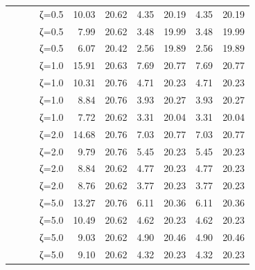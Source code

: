 \begin{table}[htbp]
\begin{tabular}{ll r l  rr  rr  rr}
  &  &  & ζ=0.5 & 10.03 & 20.62 & 4.35 & 20.19 & 4.35 & 20.19 \\
  &  &  & ζ=0.5 & 7.99 & 20.62 & 3.48 & 19.99 & 3.48 & 19.99 \\
  &  &  & ζ=0.5 & 6.07 & 20.42 & 2.56 & 19.89 & 2.56 & 19.89 \\
  &  &  & ζ=1.0 & 15.91 & 20.63 & 7.69 & 20.77 & 7.69 & 20.77 \\
  &  &  & ζ=1.0 & 10.31 & 20.76 & 4.71 & 20.23 & 4.71 & 20.23 \\
  &  &  & ζ=1.0 & 8.84 & 20.76 & 3.93 & 20.27 & 3.93 & 20.27 \\
  &  &  & ζ=1.0 & 7.72 & 20.62 & 3.31 & 20.04 & 3.31 & 20.04 \\
  &  &  & ζ=2.0 & 14.68 & 20.76 & 7.03 & 20.77 & 7.03 & 20.77 \\
  &  &  & ζ=2.0 & 9.79 & 20.76 & 5.45 & 20.23 & 5.45 & 20.23 \\
  &  &  & ζ=2.0 & 8.84 & 20.62 & 4.77 & 20.23 & 4.77 & 20.23 \\
  &  &  & ζ=2.0 & 8.76 & 20.62 & 3.77 & 20.23 & 3.77 & 20.23 \\
  &  &  & ζ=5.0 & 13.27 & 20.76 & 6.11 & 20.36 & 6.11 & 20.36 \\
  &  &  & ζ=5.0 & 10.49 & 20.62 & 4.62 & 20.23 & 4.62 & 20.23 \\
  &  &  & ζ=5.0 & 9.03 & 20.62 & 4.90 & 20.46 & 4.90 & 20.46 \\
  &  &  & ζ=5.0 & 9.10 & 20.62 & 4.32 & 20.23 & 4.32 & 20.23 \\
\bottomrule
\end{tabular}
\end{table}